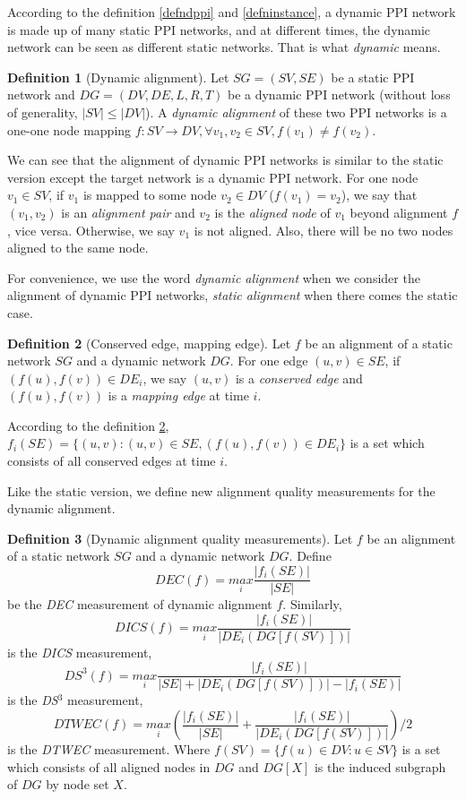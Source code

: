 \documentclass{bioinfo}
\theoremstyle{definition}
\newtheorem{defn}{\textbf{Definition}}[section]%
\begin{document}
\begin{methods}
According to the definition \ref{defndppi} and \ref{defninstance}, a dynamic PPI network is made up of many static PPI networks, and at different times, the dynamic network can be seen as different static networks. That is what \textit{dynamic} means.

\begin{defn}[Dynamic alignment]
\label{defndppigna}
Let $SG=(SV,SE)$ be a static PPI network and $DG=(DV,DE,L,R,T)$ be a dynamic PPI network (without loss of generality, $|SV|\leq |DV|$). A \textit{dynamic alignment} of these two PPI networks is a one-one node mapping $f:SV\rightarrow DV,\forall v_1,v_2\in SV,f(v_1)\neq f(v_2)$. 
\end{defn}

We can see that the alignment of dynamic PPI networks is similar to the static version except the target network is a dynamic PPI network. For one node $v_1\in SV$, if $v_1$ is mapped to some node $v_2\in DV$ ($f(v_1)=v_2$), we say that $(v_1,v_2)$ is an \textit{alignment pair} and $v_2$ is the \textit{aligned node} of $v_1$ beyond alignment $f$, vice versa. Otherwise, we say $v_1$ is not aligned. Also, there will be no two nodes aligned to the same node.

For convenience, we use the word \textit{dynamic alignment} when we consider the alignment of dynamic PPI networks, \textit{static alignment} when there comes the static case.

\begin{defn}[Conserved edge, mapping edge]
\label{defnceme}
Let $f$ be an alignment of a static network $SG$ and a dynamic network $DG$. For one edge $(u,v)\in SE$, if $(f(u),f(v))\in DE_i$, we say $(u,v)$ is a \textit{conserved edge} and $(f(u),f(v))$ is a \textit{mapping edge} at time $i$. 
\end{defn}

According to the definition \ref{defnceme}, $f_i(SE)=\{(u,v):(u,v)\in SE,(f(u),f(v))\in DE_i\}$ is a set which consists of all conserved edges at time $i$. 

Like the static version, we define new alignment quality measurements for the dynamic alignment.
\begin{defn}[Dynamic alignment quality measurements]
\label{defndmeasure}
Let $f$ be an alignment of a static network $SG$ and a dynamic network $DG$. Define $$DEC(f)=\underset{i}{max}\frac{\left | f_i(SE) \right |}{\left | SE \right |}$$ be the \textit{DEC} measurement of dynamic alignment $f$. Similarly, 
$$DICS(f)=\underset{i}{max}\frac{\left | f_i(SE) \right |}{\left |DE_i(DG[f(SV)])\right |}$$ is the \textit{DICS} measurement,
$$DS^{3}(f)=\underset{i}{max}\frac{\left | f_i(SE) \right |}{\left | SE \right |+\left |DE_i(DG[f(SV)]) \right |-\left | f_i(SE) \right |}$$ is the \textit{DS}$^{3}$ measurement,
$$DTWEC(f)=\underset{i}{max}(\frac{\left | f_i(SE) \right |}{\left | SE \right |}+\frac{\left | f_i(SE) \right |}{\left |DE_i(DG[f(SV)])\right |})/2$$ is the \textit{DTWEC} measurement. Where $f(SV)=\{f(u)\in DV:u\in SV\}$ is a set which consists of all aligned nodes in $DG$ and $DG[X]$ is the induced subgraph of $DG$ by node set $X$.
\end{defn}


\end{methods}
\end{document}
